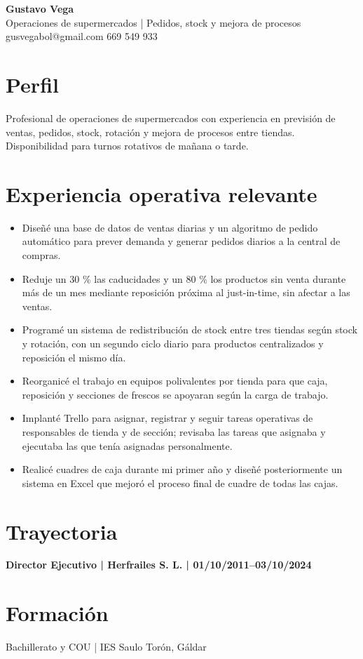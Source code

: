 \documentclass[11pt,a4paper]{article}
\begin{document}
{\color{primary}\LARGE\textbf{Gustavo Vega}}\\
{\color{secondary}\large Operaciones de supermercados | Pedidos, stock y mejora de procesos}\\
gusvegabol@gmail.com \textbar{} 669 549 933

\section*{Perfil}
Profesional de operaciones de supermercados con experiencia en previsión de ventas, pedidos, stock, rotación y mejora de procesos entre tiendas.
Disponibilidad para turnos rotativos de mañana o tarde.\\

\section*{Experiencia operativa relevante}
\begin{itemize}[leftmargin=*,nosep]
\item Diseñé una base de datos de ventas diarias y un algoritmo de pedido automático para prever demanda y generar pedidos diarios a la central de compras.
\item Reduje un 30 \% las caducidades y un 80 \% los productos sin venta durante más de un mes mediante reposición próxima al just-in-time, sin afectar a las ventas.
\item Programé un sistema de redistribución de stock entre tres tiendas según stock y rotación, con un segundo ciclo diario para productos centralizados y reposición el mismo día.
\item Reorganicé el trabajo en equipos polivalentes por tienda para que caja, reposición y secciones de frescos se apoyaran según la carga de trabajo.
\item Implanté Trello para asignar, registrar y seguir tareas operativas de responsables de tienda y de sección; revisaba las tareas que asignaba y ejecutaba las que tenía asignadas personalmente.
\item Realicé cuadres de caja durante mi primer año y diseñé posteriormente un sistema en Excel que mejoró el proceso final de cuadre de todas las cajas.
\end{itemize}

\section*{Trayectoria}
\textbf{Director Ejecutivo | Herfrailes S. L. | 01/10/2011–03/10/2024}

\section*{Formación}
Bachillerato y COU | IES Saulo Torón, Gáldar\\
\end{document}

